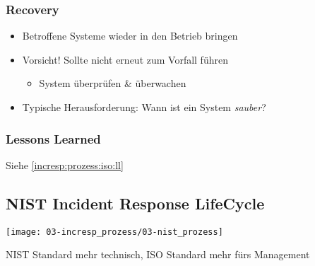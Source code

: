 \subsubsection{Recovery}
\begin{itemize}
    \item Betroffene Systeme wieder in den Betrieb bringen
    \item Vorsicht! Sollte nicht erneut zum Vorfall führen
    \begin{itemize}
        \item System überprüfen \& überwachen
    \end{itemize}
    \item Typische Herausforderung: Wann ist ein System \textit{sauber}?
\end{itemize}

\subsubsection{Lessons Learned}
Siehe \ref{incresp:prozess:iso:ll}

\subsection{NIST Incident Response LifeCycle}
\begin{center}
    \vspace{-8pt}
    \texttt{[image: 03-incresp\_prozess/03-nist\_prozess]}
    \vspace{-8pt}
\end{center}

NIST Standard mehr technisch, ISO Standard mehr fürs Management



